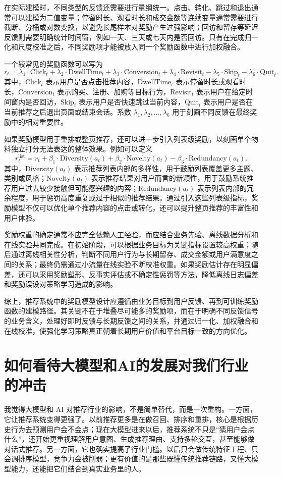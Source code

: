 \documentclass[UTF8]{ctexart}
\begin{document}
在实际建模时，不同类型的反馈还需要进行量纲统一。点击、转化、跳过和退出通常可以建模为二值变量；停留时长、观看时长和成交金额等连续变量通常需要进行截断、分桶或对数变换，以避免长尾样本对奖励产生过强影响；回访和留存等延迟反馈则需要明确统计时间窗，例如一天、三天或七天内是否回访。只有在完成归一化和尺度校准之后，不同奖励项才能被放入同一个奖励函数中进行加权融合。

一个较常见的奖励函数可以写为
\[ r_t=\lambda_1 \cdot \mathrm{Click}_t+\lambda_2 \cdot \mathrm{DwellTime}_t+\lambda_3 \cdot \mathrm{Conversion}_t+\lambda_4 \cdot \mathrm{Revisit}_t-\lambda_5 \cdot \mathrm{Skip}_t-\lambda_6 \cdot \mathrm{Quit}_t . \]
其中，\(\mathrm{Click}_t\) 表示用户是否点击推荐内容，\(\mathrm{DwellTime}_t\) 表示停留时长或观看时长，\(\mathrm{Conversion}_t\) 表示购买、注册、加购等目标行为，\(\mathrm{Revisit}_t\) 表示用户在给定时间窗内是否回访，\(\mathrm{Skip}_t\) 表示用户是否快速跳过当前内容，\(\mathrm{Quit}_t\) 表示用户是否在当前推荐之后退出页面或结束会话。系数 \(\lambda_1,\lambda_2,\ldots,\lambda_6\) 用于刻画不同反馈在最终奖励中的相对重要性。

如果奖励模型用于重排或整页推荐，还可以进一步引入列表级奖励，以刻画单个物料独立打分无法表达的整体效果。例如可以定义
\[ r_t^{\mathrm{list}}=r_t+\beta_1 \cdot \mathrm{Diversity}(a_t)+\beta_2 \cdot \mathrm{Novelty}(a_t)-\beta_3 \cdot \mathrm{Redundancy}(a_t). \]
其中，\(\mathrm{Diversity}(a_t)\) 表示推荐列表内部的多样性，用于鼓励列表覆盖更多主题、类别或风格；\(\mathrm{Novelty}(a_t)\) 表示推荐结果对用户而言的新颖性，用于鼓励系统推荐用户过去较少接触但可能感兴趣的内容；\(\mathrm{Redundancy}(a_t)\) 表示列表内部的冗余程度，用于惩罚高度重复或过于相似的推荐结果。通过引入这些列表级指标，奖励模型不仅可以优化单个推荐内容的点击或转化，还可以提升整页推荐的丰富性和用户体验。

奖励权重的确定通常不应完全依赖人工经验，而应结合业务先验、离线数据分析和在线实验共同完成。在初始阶段，可以根据业务目标为关键指标设置较高权重；随后通过离线相关性分析，判断不同用户行为与长期留存、成交金额或用户满意度之间的关系；最终仍需通过小流量在线实验不断校准权重。如果奖励估计存在明显偏差，还可以采用奖励塑形、反事实评估或不确定性惩罚等方法，降低离线日志偏差和奖励误设对策略学习造成的影响。

综上，推荐系统中的奖励模型设计应遵循由业务目标到用户反馈、再到可训练奖励函数的建模路径。其关键不在于堆叠尽可能多的奖励项，而在于明确不同反馈信号的业务含义，处理好即时反馈与长期反馈之间的关系，并通过归一化、加权融合和在线校准，使强化学习策略真正朝着长期用户价值和平台目标一致的方向优化。

\section{如何看待大模型和AI的发展对我们行业的冲击}
我觉得大模型和 AI 对推荐行业的影响，不是简单替代，而是一次重构。一方面，它让推荐系统变得更强了。以前推荐更多是在做召回、排序和重排，核心是根据历史行为去预测用户会不会点；现在大模型进来以后，推荐系统不只是“猜用户会点什么”，还开始更重视理解用户意图、生成推荐理由、支持多轮交互，甚至能够做对话式推荐。另一方面，它也确实提高了行业门槛。以后只会做传统特征工程、只会调排序模型，竞争力会被削弱；更有价值的是那些既懂传统推荐链路，又懂大模型能力，还能把它们结合到真实业务里的人。
\end{document}
